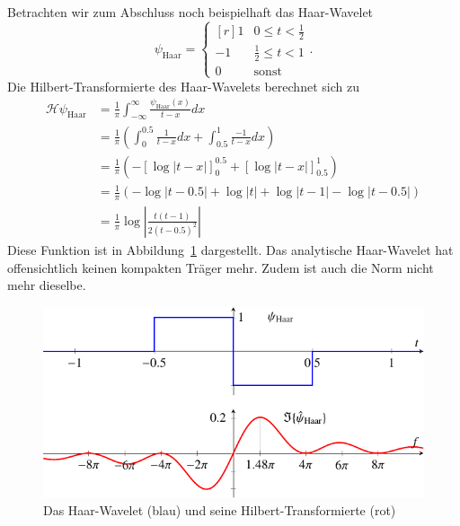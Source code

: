 \begin{refsection}
Betrachten wir zum Abschluss noch beispielhaft das Haar-Wavelet
\[
	\psi_{\text{Haar}} = \left\lbrace\begin{matrix*}[r]
		1 & 0 \le t < \frac{1}{2} \\
		-1 & \frac{1}{2} \le t < 1 \\
		0 & \text{sonst}
	\end{matrix*} \right..
\]
Die Hilbert-Transformierte des Haar-Wavelets berechnet sich zu
\begin{align*}
	\mathcal{H} \psi_{\text{Haar}}
	&= \frac{1}{\pi} \int_{-\infty}^{\infty} \frac{\psi_{\text{Haar}}(x)}{t-x} dx\\
	&= \frac{1}{\pi}\left( \int_{0}^{0.5} \frac{1}{t-x}dx + \int_{0.5}^{1} \frac{-1}{t-x}dx \right)\\
	&= \frac{1}{\pi} \left( -\left[\log \left|t-x\right| \right]_0^{0.5} + \left[\log\left|t-x\right| \right]_{0.5}^{1} \right)\\
	&= \frac{1}{\pi} \left( -\log\left|t-0.5\right| + \log\left|t\right| + \log\left|t-1\right| - \log\left|t-0.5\right|\right)\\
	&= \frac{1}{\pi} \log\left|\frac{t(t-1)}{2(t-0.5)^2}\right|
\end{align*}
Diese Funktion ist in Abbildung~\ref{complex:haar} dargestellt.
Das analytische Haar-Wavelet hat offensichtlich keinen kompakten Träger mehr.
Zudem ist auch die Norm nicht mehr dieselbe.

\begin{figure}
	\centering
	\includegraphics{papers/complex/images/haar.pdf}
	\caption{Das Haar-Wavelet (blau) und seine Hilbert-Transformierte (rot)
		\label{complex:haar}}
\end{figure}



\end{refsection}
